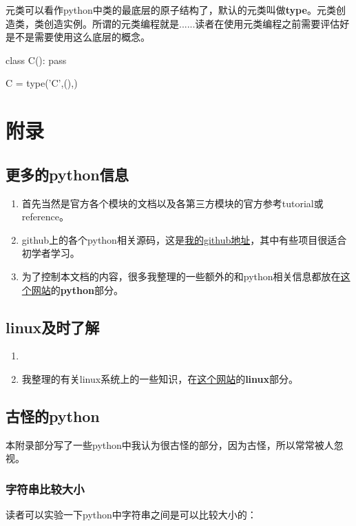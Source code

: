 \documentclass[12pt,oneside]{book}
\begin{document}
\begin{common-format}
元类可以看作python中类的最底层的原子结构了，默认的元类叫做\textbf{type}。元类创造类，类创造实例。所谓的元类编程就是......读者在使用元类编程之前需要评估好是不是需要使用这么底层的概念。

\begin{tcbpython}[]
class C():
    pass
\end{tcbpython}

\begin{tcbpython}[]
C = type('C',(),{})
\end{tcbpython}



\appendix
\part{附录}

\chapter{更多的python信息}


\begin{enumerate}
\item 首先当然是官方各个模块的文档以及各第三方模块的官方参考tutorial或reference。
\item github上的各个python相关源码，这是\href{https://github.com/a358003542}{我的github地址}，其中有些项目很适合初学者学习。
\item 为了控制本文档的内容，很多我整理的一些额外的和python相关信息都放在\href{http://www.cdwanze.org/}{这个网站}的\textbf{python}部分。
\end{enumerate}


\chapter{linux及时了解}
\begin{enumerate}
\item 
\item 我整理的有关linux系统上的一些知识，在\href{http://www.cdwanze.org/}{这个网站}的\textbf{linux}部分。
\end{enumerate}


\chapter{古怪的python}
本附录部分写了一些python中我认为很古怪的部分，因为古怪，所以常常被人忽视。

\section{字符串比较大小}
读者可以实验一下python中字符串之间是可以比较大小的：


\end{common-format}
\end{document}
